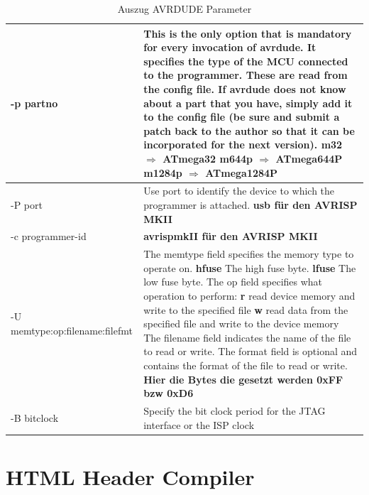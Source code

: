 \begin{table}
\begin{tabular}{| p{} | p{} |}
\hline
-p partno & This is the only option that is mandatory for every invocation of
avrdude.  It specifies the type of the MCU connected to the programmer. These
are read from the config file.  If avrdude does not know about a part that you
have, simply add it to the config file (be sure and submit a patch back to the
author so that it can be incorporated for the next version). \newline
\textbf{m32 $\Rightarrow$ ATmega32} \newline 
\textbf{m644p $\Rightarrow$ ATmega644P} \newline
\textbf{m1284p $\Rightarrow$ ATmega1284P} \\ \hline
-P port & Use port to identify the device to which the programmer is attached. \textbf{usb für den AVRISP MKII}  \\ \hline 
-c programmer-id & \textbf{avrispmkII für den AVRISP MKII} \\ \hline
-U \hbox{memtype:op:filename:filefmt} &  
The \textrm{memtype} field specifies the memory type to operate on.\newline
\textbf{hfuse} The high fuse byte.\newline
\textbf{lfuse} The low fuse byte.\newline
The \textrm{op} field specifies what operation to perform:\newline
\textbf{r} read device memory and write to the specified file\newline
\textbf{w} read data from the specified file and write to the device memory \newline
The filename field indicates the name of the file to read or write.  The format field is optional and contains the format of the file to read or write. \newline
\textbf{Hier die Bytes die gesetzt werden 0xFF bzw 0xD6} \\ \hline
-B bitclock & Specify the bit clock period for the JTAG interface or the ISP clock \\ \hline
\end{tabular}
\caption{Auszug AVRDUDE Parameter}
\label{parameterAvrdude2}
\end{table}
\newpage

\section{HTML Header Compiler}
\label{chap:benutzerhandbuch.HHC}

